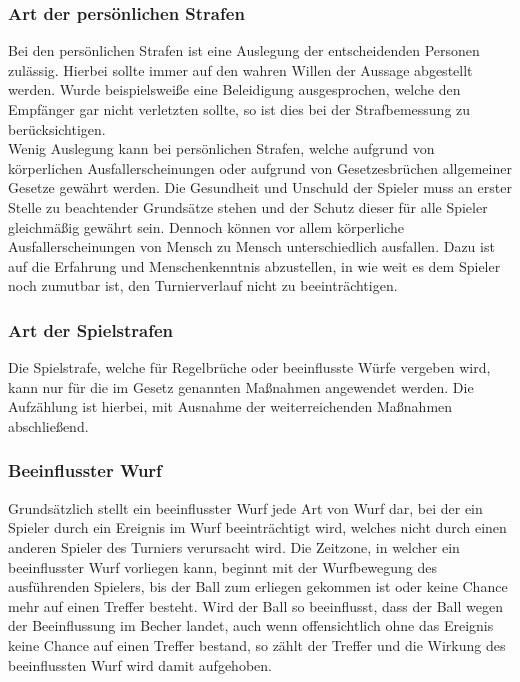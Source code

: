 \documentclass[a4paper, 12pt]{article}
\begin{document}
\subsubsection{Art der persönlichen Strafen}
Bei den persönlichen Strafen ist eine Auslegung der entscheidenden Personen zulässig. Hierbei sollte immer auf den wahren Willen der Aussage abgestellt werden. Wurde beispielsweiße eine Beleidigung ausgesprochen, welche den Empfänger gar nicht verletzten sollte, so ist dies bei der Strafbemessung zu berücksichtigen.\\
Wenig Auslegung kann bei persönlichen Strafen, welche aufgrund von körperlichen Ausfallerscheinungen oder aufgrund von Gesetzesbrüchen allgemeiner Gesetze gewährt werden. Die Gesundheit und Unschuld der Spieler muss an erster Stelle zu beachtender Grundsätze stehen und der Schutz dieser für alle Spieler gleichmäßig gewährt sein. Dennoch können vor allem körperliche Ausfallerscheinungen von Mensch zu Mensch unterschiedlich ausfallen. Dazu ist auf die Erfahrung und Menschenkenntnis abzustellen, in wie weit es dem Spieler noch zumutbar ist, den Turnierverlauf nicht zu beeinträchtigen.
\subsubsection{Art der Spielstrafen}
Die Spielstrafe, welche für Regelbrüche oder beeinflusste Würfe vergeben wird, kann nur für die im Gesetz genannten Maßnahmen angewendet werden. Die Aufzählung ist hierbei, mit Ausnahme der weiterreichenden Maßnahmen abschließend.
\subsubsection{Beeinflusster Wurf}
Grundsätzlich stellt ein beeinflusster Wurf jede Art von Wurf dar, bei der ein Spieler durch ein Ereignis im Wurf beeinträchtigt wird, welches nicht durch einen anderen Spieler des Turniers verursacht wird. Die Zeitzone, in welcher ein beeinflusster Wurf vorliegen kann, beginnt mit der Wurfbewegung des ausführenden Spielers, bis der Ball zum erliegen gekommen ist oder keine Chance mehr auf einen Treffer besteht. Wird der Ball so beeinflusst, dass der Ball wegen der Beeinflussung im Becher landet, auch wenn offensichtlich ohne das Ereignis keine Chance auf einen Treffer bestand, so zählt der Treffer und die Wirkung des beeinflussten Wurf wird damit aufgehoben.
\end{document}
